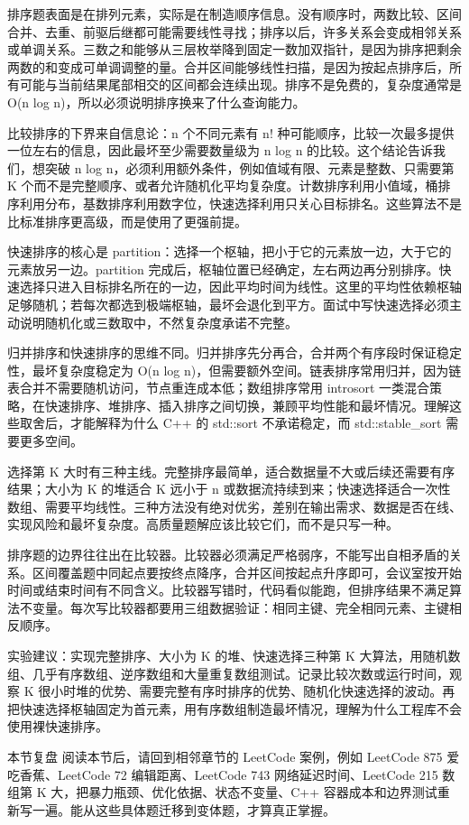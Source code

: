
排序题表面是在排列元素，实际是在制造顺序信息。没有顺序时，两数比较、区间合并、去重、前驱后继都可能需要线性寻找；排序以后，许多关系会变成相邻关系或单调关系。三数之和能够从三层枚举降到固定一数加双指针，是因为排序把剩余两数的和变成可单调调整的量。合并区间能够线性扫描，是因为按起点排序后，所有可能与当前结果尾部相交的区间都会连续出现。排序不是免费的，复杂度通常是 O(n log n)，所以必须说明排序换来了什么查询能力。

比较排序的下界来自信息论：n 个不同元素有 n! 种可能顺序，比较一次最多提供一位左右的信息，因此最坏至少需要数量级为 n log n 的比较。这个结论告诉我们，想突破 n log n，必须利用额外条件，例如值域有限、元素是整数、只需要第 K 个而不是完整顺序、或者允许随机化平均复杂度。计数排序利用小值域，桶排序利用分布，基数排序利用数字位，快速选择利用只关心目标排名。这些算法不是比标准排序更高级，而是使用了更强前提。

快速排序的核心是 partition：选择一个枢轴，把小于它的元素放一边，大于它的元素放另一边。partition 完成后，枢轴位置已经确定，左右两边再分别排序。快速选择只进入目标排名所在的一边，因此平均时间为线性。这里的平均性依赖枢轴足够随机；若每次都选到极端枢轴，最坏会退化到平方。面试中写快速选择必须主动说明随机化或三数取中，不然复杂度承诺不完整。

归并排序和快速排序的思维不同。归并排序先分再合，合并两个有序段时保证稳定性，最坏复杂度稳定为 O(n log n)，但需要额外空间。链表排序常用归并，因为链表合并不需要随机访问，节点重连成本低；数组排序常用 introsort 一类混合策略，在快速排序、堆排序、插入排序之间切换，兼顾平均性能和最坏情况。理解这些取舍后，才能解释为什么 C++ 的 std::sort 不承诺稳定，而 std::stable\_sort 需要更多空间。

选择第 K 大时有三种主线。完整排序最简单，适合数据量不大或后续还需要有序结果；大小为 K 的堆适合 K 远小于 n 或数据流持续到来；快速选择适合一次性数组、需要平均线性。三种方法没有绝对优劣，差别在输出需求、数据是否在线、实现风险和最坏复杂度。高质量题解应该比较它们，而不是只写一种。

排序题的边界往往出在比较器。比较器必须满足严格弱序，不能写出自相矛盾的关系。区间覆盖题中同起点要按终点降序，合并区间按起点升序即可，会议室按开始时间或结束时间有不同含义。比较器写错时，代码看似能跑，但排序结果不满足算法不变量。每次写比较器都要用三组数据验证：相同主键、完全相同元素、主键相反顺序。

实验建议：实现完整排序、大小为 K 的堆、快速选择三种第 K 大算法，用随机数组、几乎有序数组、逆序数组和大量重复数组测试。记录比较次数或运行时间，观察 K 很小时堆的优势、需要完整有序时排序的优势、随机化快速选择的波动。再把快速选择枢轴固定为首元素，用有序数组制造最坏情况，理解为什么工程库不会使用裸快速排序。

\begin{principlebox}{本节复盘}
阅读本节后，请回到相邻章节的 LeetCode 案例，例如 LeetCode 875 爱吃香蕉、LeetCode 72 编辑距离、LeetCode 743 网络延迟时间、LeetCode 215 数组第 K 大，把暴力瓶颈、优化依据、状态不变量、C++ 容器成本和边界测试重新写一遍。能从这些具体题迁移到变体题，才算真正掌握。
\end{principlebox}
